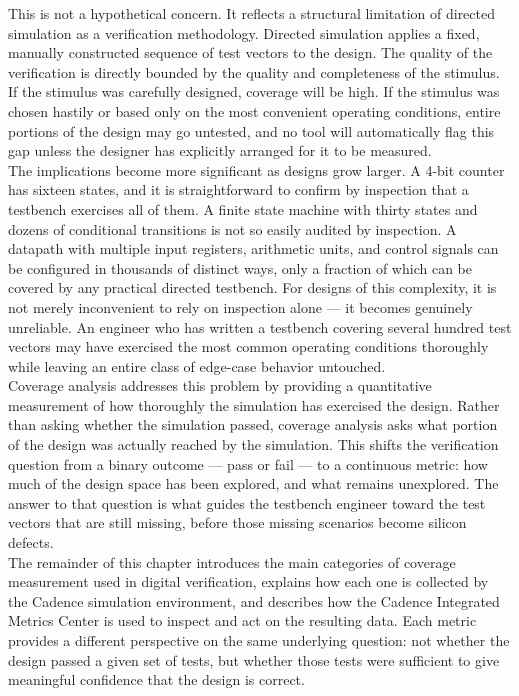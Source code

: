 This is not a hypothetical concern. It reflects a structural limitation of directed simulation as a verification methodology. Directed simulation applies a fixed, manually constructed sequence of test vectors to the design. The quality of the verification is directly bounded by the quality and completeness of the stimulus. If the stimulus was carefully designed, coverage will be high. If the stimulus was chosen hastily or based only on the most convenient operating conditions, entire portions of the design may go untested, and no tool will automatically flag this gap unless the designer has explicitly arranged for it to be measured.\\

The implications become more significant as designs grow larger. A 4-bit counter has sixteen states, and it is straightforward to confirm by inspection that a testbench exercises all of them. A finite state machine with thirty states and dozens of conditional transitions is not so easily audited by inspection. A datapath with multiple input registers, arithmetic units, and control signals can be configured in thousands of distinct ways, only a fraction of which can be covered by any practical directed testbench. For designs of this complexity, it is not merely inconvenient to rely on inspection alone — it becomes genuinely unreliable. An engineer who has written a testbench covering several hundred test vectors may have exercised the most common operating conditions thoroughly while leaving an entire class of edge-case behavior untouched.\\

Coverage analysis addresses this problem by providing a quantitative measurement of how thoroughly the simulation has exercised the design. Rather than asking whether the simulation passed, coverage analysis asks what portion of the design was actually reached by the simulation. This shifts the verification question from a binary outcome — pass or fail — to a continuous metric: how much of the design space has been explored, and what remains unexplored. The answer to that question is what guides the testbench engineer toward the test vectors that are still missing, before those missing scenarios become silicon defects.\\

The remainder of this chapter introduces the main categories of coverage measurement used in digital verification, explains how each one is collected by the Cadence simulation environment, and describes how the Cadence Integrated Metrics Center is used to inspect and act on the resulting data. Each metric provides a different perspective on the same underlying question: not whether the design passed a given set of tests, but whether those tests were sufficient to give meaningful confidence that the design is correct.\\

